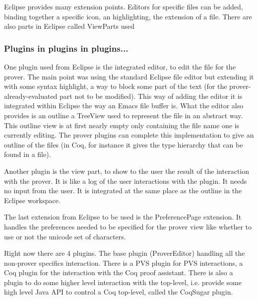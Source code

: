 \documentclass{entcs}
\begin{document}
Eclipse provides many extension points. Editors for specific files can be
added, binding together a specific icon, an highlighting, the extension of a
file. There are also parts in Eclipse called ViewParts used

\subsubsection{Plugins in plugins in plugins...}
\label{subsubsec:plug-plug-plug}
One plugin used from Eclipse is the integrated editor, to edit the 
file for the prover. The main point was using the standard Eclipse file editor
but extending it with some syntax highlight, a way to block some part
of the text (for the prover-already-evaluated part not to be modified). This
way of adding the editor it is integrated within Eclipse the way an Emacs 
file buffer is.  What the editor also provides is an outline a TreeView
used to represent the file in an abstract way. This outline view
is at first nearly empty only containing the file name one is currently
editing. The prover plugins can complete this implementation to give
an outline of the files (in Coq, for instance it gives the type
hierarchy that can be found in a file).

Another plugin is the view part, to show to the user the result of the
interaction with the prover. It is like a log of the user interactions
with the plugin. It needs no input from the user. It is integrated
at the same place as the outline in the Eclipse workspace.

The last extension from Eclipse to be used is the PreferencePage extension.
It handles the preferences needed to be specified for the prover view
like whether to use or not the unicode set of characters.


Right now there are 4 plugins. The base plugin (ProverEditor)
handling all the non-prover specifics interaction. There is a PVS plugin for
PVS interactions, a Coq plugin for the interaction with the Coq proof 
assistant. There is also a plugin to do some higher level interaction 
with the top-level, i.e. provide some high level Java API to control 
a Coq top-level, called the CoqSugar plugin. 

\end{document}
